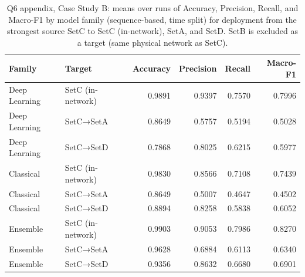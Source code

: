 \begin{table}
\caption{Q6 appendix, Case Study B: means over runs of Accuracy, Precision, Recall, and Macro-F1 by model family (sequence-based, time split) for deployment from the strongest source SetC to SetC (in-network), SetA, and SetD. SetB is excluded as a target (same physical network as SetC).}
\label{tab:q6_appendix_cs_deploy}
\begin{tabular}{llrrrr}
\toprule
Family & Target & Accuracy & Precision & Recall & Macro-F1 \\
\midrule
Deep Learning & SetC (in-network) & 0.9891 & 0.9397 & 0.7570 & 0.7996 \\
Deep Learning & SetC→SetA & 0.8649 & 0.5757 & 0.5194 & 0.5028 \\
Deep Learning & SetC→SetD & 0.7868 & 0.8025 & 0.6215 & 0.5977 \\
Classical & SetC (in-network) & 0.9830 & 0.8566 & 0.7108 & 0.7439 \\
Classical & SetC→SetA & 0.8649 & 0.5007 & 0.4647 & 0.4502 \\
Classical & SetC→SetD & 0.8894 & 0.8258 & 0.5838 & 0.6052 \\
Ensemble & SetC (in-network) & 0.9903 & 0.9053 & 0.7986 & 0.8270 \\
Ensemble & SetC→SetA & 0.9628 & 0.6884 & 0.6113 & 0.6340 \\
Ensemble & SetC→SetD & 0.9356 & 0.8632 & 0.6680 & 0.6901 \\
\bottomrule
\end{tabular}
\end{table}
